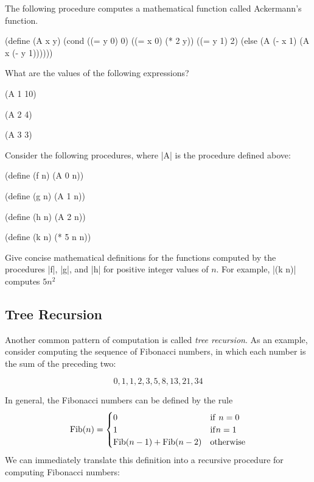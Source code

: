 \begin{Exercise}
\label{exc:1.10}
The following procedure computes a mathematical function called
Ackermann's function.

\begin{schemedisplay}
(define (A x y)
  (cond ((= y 0) 0)
        ((= x 0) (* 2 y))
        ((= y 1) 2)
        (else (A (- x 1)
                 (A x (- y 1))))))
\end{schemedisplay}
What are the values of the following expressions?

\begin{schemedisplay}
(A 1 10)

(A 2 4)

(A 3 3)
\end{schemedisplay}

Consider the following procedures, where \scheme|A| is the procedure  
defined above:
\begin{schemedisplay}
(define (f n) (A 0 n))

(define (g n) (A 1 n))

(define (h n) (A 2 n))

(define (k n) (* 5 n n))
\end{schemedisplay}

Give concise mathematical definitions for the functions computed by
the procedures \scheme|f|, \scheme|g|, and \scheme|h| for positive integer
values of $n$.  For example, \scheme|(k n)| computes $5n^2$
\end{Exercise}

\subsection{Tree Recursion}
\label{sec:1.2.2}



Another common pattern of computation is called \textit{tree
  recursion}.  As an example, consider computing the sequence of
Fibonacci numbers, in which each number is the sum of the preceding
two:

\begin{displaymath}
0, 1, 1, 2, 3, 5, 8, 13, 21, 34
\end{displaymath}

In general, the Fibonacci numbers can be defined by the rule
\begin{displaymath}
  {\rm Fib}(n) =
  \begin{cases}
    0 & {\rm if}~ n = 0 \\
    1 & {\rm if} n = 1 \\
    {\rm Fib}(n-1) + {\rm Fib}(n-2) & {\rm otherwise}
  \end{cases}
\end{displaymath}
We can immediately translate this definition into a recursive
procedure for computing Fibonacci numbers:

